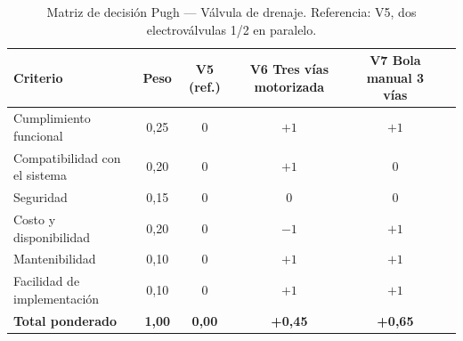 \begin{table}[H]
\centering
\caption{Matriz de decisión Pugh --- Válvula de drenaje. Referencia: V5, dos electroválvulas 1/2\textquotedbl{} en paralelo.}
\label{tab:pugh-valvula-desvio}
\begin{tabularx}{\textwidth}{Xccccc}
\toprule
\textbf{Criterio} & \textbf{Peso} & \textbf{V5 (ref.)} & \textbf{V6 Tres vías motorizada} & \textbf{V7 Bola manual 3 vías} \\
\midrule
Cumplimiento funcional        & 0,25 & 0 & $+1$ & $+1$ \\
Compatibilidad con el sistema & 0,20 & 0 & $+1$ & 0 \\
Seguridad                     & 0,15 & 0 & 0    & 0 \\
Costo y disponibilidad        & 0,20 & 0 & $-1$ & $+1$ \\
Mantenibilidad                & 0,10 & 0 & $+1$ & $+1$ \\
Facilidad de implementación   & 0,10 & 0 & $+1$ & $+1$ \\
\midrule
\textbf{Total ponderado}      & \textbf{1,00} & \textbf{0,00} & \textbf{+0,45} & \textbf{+0,65} \\
\bottomrule
\end{tabularx}
\end{table}
